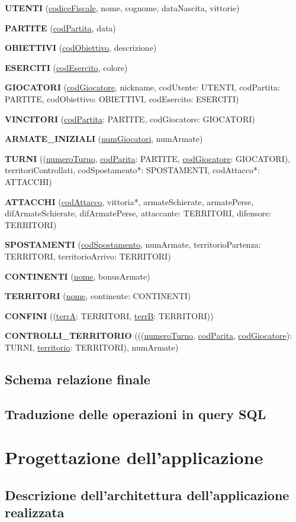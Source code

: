 \documentclass[a4paper,12pt]{report}
\begin{document}
\begin{description}
    \item \textbf{UTENTI} (\underline{codiceFiscale}, nome, cognome, dataNascita, vittorie) \par
    \item \textbf{PARTITE} (\underline{codPartita}, data) \par
    \item \textbf{OBIETTIVI} (\underline{codObiettivo}, descrizione) \par
    \item \textbf{ESERCITI} (\underline{codEsercito}, colore) \par
    \item \textbf{GIOCATORI} (\underline{codGiocatore}, nickname, codUtente: UTENTI, codPartita: PARTITE, codObiettivo: OBIETTIVI, codEsercito: ESERCITI) \par
    \item \textbf{VINCITORI} (\underline{codPartita}: PARTITE, codGiocatore: GIOCATORI) \par
    \item \textbf{ARMATE\_INIZIALI} (\underline{numGiocatori}, numArmate) \par
    \item \textbf{TURNI} ((\underline{numeroTurno}, \underline{codParita}: PARTITE, \underline{codGiocatore}: GIOCATORI), territoriControllati, codSpostamento*: SPOSTAMENTI, codAttacco*: ATTACCHI) \par
    \item \textbf{ATTACCHI} (\underline{codAttacco}, vittoria*, armateSchierate, armatePerse, difArmateSchierate, difArmatePerse, attaccante: TERRITORI, difensore: TERRITORI) \par
    \item \textbf{SPOSTAMENTI} (\underline{codSpostamento}, numArmate, territorioPartenza: TERRITORI, territorioArrivo: TERRITORI) \par
    \item \textbf{CONTINENTI} (\underline{nome}, bonusArmate) \par
    \item \textbf{TERRITORI} (\underline{nome}, continente: CONTINENTI) \par
    \item \textbf{CONFINI} ((\underline{terrA}: TERRITORI, \underline{terrB}: TERRITORI)) \par
    \item \textbf{CONTROLLI\_TERRITORIO} (((\underline{numeroTurno}, \underline{codParita}, \underline{codGiocatore}): TURNI, \underline{territorio}: TERRITORI), numArmate) \par
\end{description}

\section{Schema relazione finale}
\section{Traduzione delle operazioni in query SQL}
\chapter{Progettazione dell'applicazione}
\section{Descrizione dell'architettura dell'applicazione realizzata}
\end{document}
